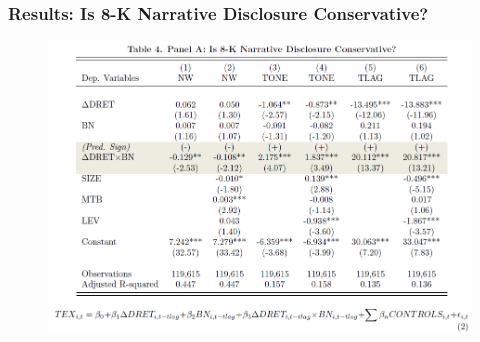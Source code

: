 \documentclass{beamer}
\begin{document}
\begin{frame}
\frametitle{Results: Is 8-K Narrative Disclosure Conservative?}
\begin{figure}[h]
	\centering
	\includegraphics[width=0.9\linewidth]{tab4panA}
	\label{tab4panA}
\end{figure}
\end{frame}
\end{document}
